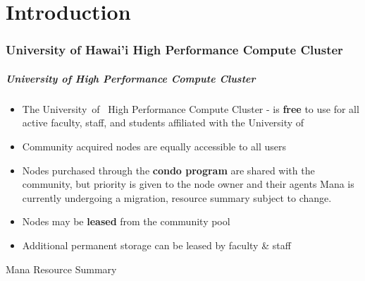 \part{Introduction}
\begin{frame}
			 \partpage
\end{frame}

\section[University of Hawai'i High Performance Compute Cluster]{University of Hawai'i High Performance Compute Cluster}
\begin{frame}
    \frametitle{University of {\hawaii} High Performance Compute Cluster}
    \begin{itemize}
    \item The University~of~{\hawaii} High Performance Compute Cluster - \textbf{\mana} is \textbf{free} to use for all active faculty, staff, and students affiliated with the University of {\hawaii}
    \item Community acquired nodes are equally accessible to all users
    \item Nodes purchased through the {\textbf{condo program}} are shared with the community, but priority is given to the node owner and their agents
    \itmem Mana is currently undergoing a migration, resource summary subject to change. 
		\item Nodes may be {\textbf{leased}} from the community pool
		\item Additional permanent storage can be leased by faculty \& staff
    \end{itemize}
		\begin{block}{Mana Resource Summary\footnotemark}
  \begin{table}
    \centering
  \end{table}
	\end{block}
\end{frame}



